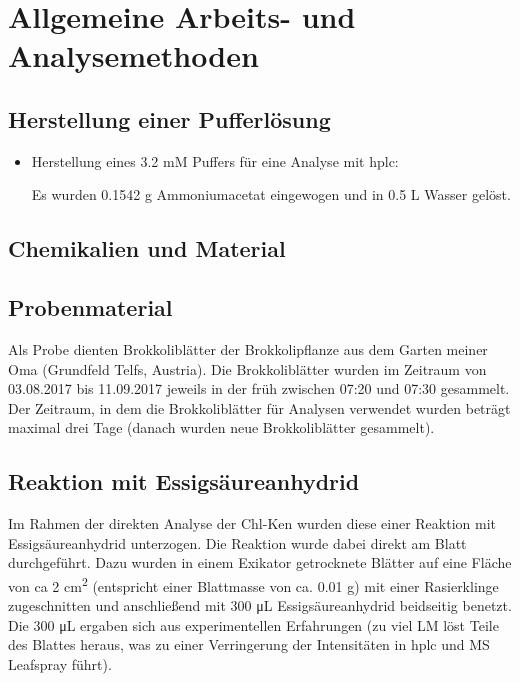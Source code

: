 \chapter{Allgemeine Arbeits- und Analysemethoden}

\section{Herstellung einer Pufferlösung}

\begin{itemize}
\item Herstellung eines 3.2 mM  Puffers für eine Analyse mit \gls{hplc}:

Es wurden 0.1542 g Ammoniumacetat eingewogen und in 0.5 L Wasser gelöst.

\end{itemize}

\section{Chemikalien und Material}

\section{Probenmaterial}

Als Probe dienten Brokkoliblätter der Brokkolipflanze aus dem Garten meiner Oma (Grundfeld Telfs, Austria). Die Brokkoliblätter wurden im Zeitraum von 03.08.2017 bis 11.09.2017 jeweils in der früh zwischen 07:20 und 07:30 gesammelt. Der Zeitraum, in dem die Brokkoliblätter für Analysen verwendet wurden beträgt maximal drei Tage (danach wurden neue Brokkoliblätter gesammelt). \\

\section{Reaktion mit Essigsäureanhydrid} \label{sec:ReaktionEssig}

Im Rahmen der direkten Analyse der \gls{Chl-K}en wurden diese einer Reaktion mit Essigsäureanhydrid unterzogen. Die Reaktion wurde dabei direkt am Blatt durchgeführt. Dazu wurden in einem Exikator getrocknete Blätter auf eine Fläche von \gls{ca} 2 cm\textsuperscript{2} (entspricht einer Blattmasse von ca. 0.01 g) mit einer Rasierklinge zugeschnitten und anschließend mit 300 \si{\uL} Essigsäureanhydrid beidseitig benetzt. Die 300 \si{\uL} ergaben sich aus experimentellen Erfahrungen (zu viel LM löst Teile des Blattes heraus, was zu einer Verringerung der Intensitäten in \gls{hplc} und MS Leafspray führt). 

